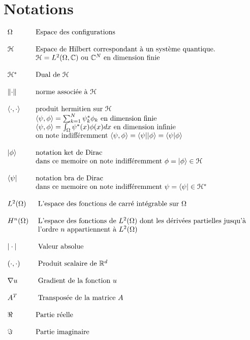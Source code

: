 \chapter*{Notations}
$
\begin{array}{ll}
\Omega & \mbox{Espace des configurations}\\\\
\mathcal{H} & \mbox{Espace de Hilbert correspondant à un système quantique.}\\
& \mathcal{H} = L^2(\Omega, \mathbb C) \mbox{ ou } \mathbb C^N  \mbox{ en dimension finie}\\\\
\mathcal{H^*} & \mbox{Dual de } \mathcal{H}\\\\
\lVert\cdot\rVert &  \mbox{norme associée à } \mathcal{H}\\\\
\langle\cdot,\cdot\rangle & \mbox{produit hermitien sur } \mathcal{H}\\
& \langle\psi,\phi\rangle=\sum_{k=1}^{N} \psi^*_k \phi_k \mbox{ en dimension finie}\\
& \langle\psi,\phi\rangle=\int_{\Omega} \psi^*(x) \phi(x) dx \mbox{ en dimension infinie}\\
&\mbox{on note indifféremment } \langle\psi,\phi\rangle = \langle\psi||\phi\rangle = \langle\psi|\phi\rangle\\\\
| \phi \rangle & \mbox{notation ket de Dirac}\\
& \mbox{dans ce memoire on note indifféremment } \phi = | \phi \rangle \in \mathcal{H}\\\\
\langle \psi | & \mbox{notation bra de Dirac}\\
& \mbox{dans ce memoire on note indifféremment } \psi = \langle  \psi | \in \mathcal{H^*}\\\\
L^2(\Omega) & \mbox{ L'espace des fonctions de carré intégrable sur } \Omega\\\\
H^n(\Omega) & \mbox{ L’espace des fonctions de }L^2(\Omega) \mbox{ dont les dérivées partielles jusqu’à }\\
&\mbox{ l’ordre } n \mbox{ appartiennent à } L^2(\Omega)\\\\
|\cdot| & \mbox{ Valeur absolue}\\\\
\left(\cdot,\cdot \right) & \mbox{ Produit scalaire de }\mathbb{R}^d\\\\
\nabla u & \mbox{ Gradient de la fonction } u\\\\
A^T & \mbox{ Transposée de la matrice } A\\\\
\Re & \mbox{Partie réelle}\\\\
\Im & \mbox{Partie imaginaire}
\end{array}
$
